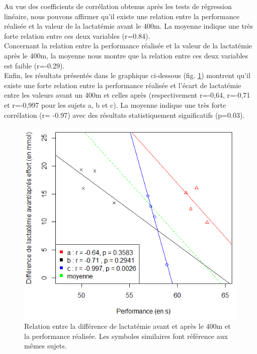             Au vue des coefficients de corrélation obtenus après les tests de régression linéaire, nous pouvons affirmer qu'il existe une relation entre la performance réalisée et la valeur de la lactatémie avant le 400m. La moyenne indique une très forte relation entre ces deux variables (r=0.84).\\
            
            Concernant la relation entre la performance réalisée et la valeur de la lactatémie après le 400m, la moyenne nous montre que la relation entre ces deux variables est faible (r=-0.29).\\
            
            Enfin, les résultats présentés dans le graphique ci-dessous (fig. \ref{fig:lact_perf_ecart}) montrent qu'il existe une forte relation entre la performance réalisée et l'écart de lactatémie entre les valeurs avant un 400m et celles après (respectivement r=-0,64, r=-0,71 et r=-0,997 pour les sujets a, b et c). La moyenne indique une très forte corrélation (r= -0.97) avec des résultats statistiquement significatifs (p=0.03).

                    
             \begin{figure}[H]
                    \centering
                    \includegraphics[scale=0.6]{images/lact_perf_ecart_moy}
                    \caption{\label{fig:lact_perf_ecart}Relation entre la différence de lactatémie avant et après le 400m et la performance réalisée. Les symboles similaires font référence aux mêmes sujets.}
            \end{figure}
        
